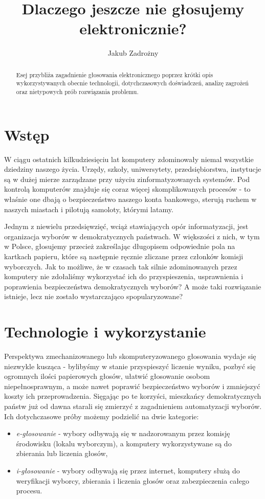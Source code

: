 \documentclass[polish]{kbk}
\begin{document}
\author{Jakub Zadrożny}
\title{Dlaczego jeszcze nie głosujemy elektronicznie?}

\maketitle

\begin{abstract}
Esej przybliża zagadnienie głosowania elektronicznego poprzez krótki opis wykorzystywanych obecnie technologii, dotychczasowych doświadczeń, analizę zagrożeń oraz nietypowych prób rozwiązania problemu.
\end{abstract}

\section{Wstęp}
W ciągu ostatnich kilkudziesięciu lat komputery zdominowały niemal wszystkie dziedziny naszego życia. Urzędy, szkoły, uniwersytety, przedsiębiorstwa, instytucje są w dużej mierze zarządzane przy użyciu zinformatyzowanych systemów. Pod kontrolą komputerów znajduje się coraz więcej skomplikowanych procesów - to właśnie one dbają o bezpieczeństwo naszego konta bankowego, sterują ruchem w naszych miastach i pilotują samoloty, którymi latamy.

Jednym z niewielu przedsięwzięć, wciąż stawiających opór informatyzacji, jest organizacja wyborów w demokratycznych państwach. W większości z nich, w tym w Polsce, głosujemy przecież zakreślając długopisem odpowiednie pola na kartkach papieru, które są następnie ręcznie zliczane przez członków komisji wyborczych. Jak to możliwe, że w czasach tak silnie zdominowanych przez komputery nie zdołaliśmy wykorzystać ich do przyspieszenia, usprawnienia i poprawienia bezpieczeństwa demokratycznych wyborów? A może taki rozwiązanie istnieje, lecz nie zostało wystarczająco spopularyzowane?

\section{Technologie i wykorzystanie}
Perspektywa zmechanizowanego lub skomputeryzowanego głosowania wydaje się niezwykle kusząca - bylibyśmy w stanie przyspieszyć liczenie wyniku, pozbyć się ogromnych ilości papierowych głosów, ułatwić głosowanie osobom niepełnosprawnym, a może nawet poprawić bezpieczeństwo wyborów i zmniejszyć koszty ich przeprowadzenia. Sięgając po te korzyści, mieszkańcy demokratycznych państw już od dawna starali się zmierzyć z zagadnieniem automatyzacji wyborów. Ich dotychczasowe próby możemy podzielić na dwie kategorie:
\begin{itemize}
\item \textit{e-głosowanie} - wybory odbywają się w nadzorowanym przez komisję środowisku (lokalu wyborczym), a komputery wykorzystywane są do zbierania lub liczenia głosów,
\item \textit{i-głosowanie} - wybory odbywają się przez internet, komputery służą do weryfikacji wyborcy, zbierania i liczenia głosów oraz zabezpieczenia całego procesu.
\end{itemize}
\end{document}
